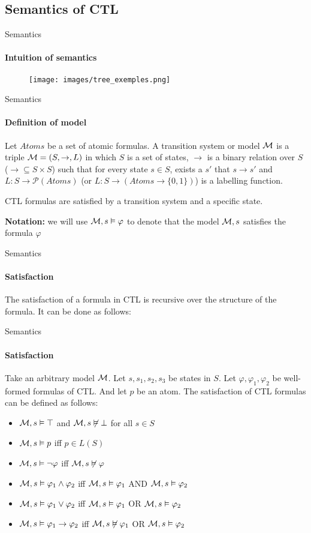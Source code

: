 \subsection{Semantics of CTL}


\begin{frame}{Semantics}
    \framesubtitle{Intuition of semantics}
    \begin{figure}
        \texttt{[image: images/tree\_exemples.png]}
    \end{figure}
\end{frame}
\begin{frame}{Semantics}
	\framesubtitle{Definition of model}
	\begin{definition}
		Let $Atoms$ be a set of atomic formulas. A \alert{transition system} or \alert{model} $\mathcal{M}$ is a triple $\mathcal{M} = (S, \to, L)$ in which $S$ is a set of states, $\to$ is a binary relation over $S$ ($\to \subseteq S\times S$) such that for every state $s\in S$, exists a $s'$ that $s \to s'$ and $L: S \to \mathcal{P}(Atoms)$ (or $L: S \to (Atoms \to \{0,1\})$) is a labelling function.
	\end{definition}\pause
    CTL formulas are satisfied by a transition system and a specific state.
    
	{\bf Notation:} we will use $\mathcal{M},s\vDash \varphi$ to denote that the model $\mathcal{M},s$ satisfies the formula $\varphi$
\end{frame}

\begin{frame}{Semantics}
    \framesubtitle{Satisfaction}
    \begin{definition}
        The \alert{satisfaction} of a formula in CTL is recursive over the structure of the formula. It can be done as follows:
    \end{definition}
\end{frame}


\begin{frame}{Semantics}
	\framesubtitle{Satisfaction}
	Take an arbitrary model $\mathcal{M}$. Let $s, s_1, s_2, s_3$ be states in $S$. Let $\varphi, \varphi_1, \varphi_2$ be well-formed formulas of CTL. And let $p$ be an atom. The satisfaction of CTL formulas can be defined as follows:
	\begin{itemize}
		\item $\mathcal{M},s \vDash \top$ and $\mathcal{M},s \not\vDash \bot$ for all $s \in S$ \pause
		\item $\mathcal{M},s \vDash p$ iff $p \in L(S)$ \pause
		\item $\mathcal{M},s \vDash \neg\varphi$ iff $\mathcal{M},s \not\vDash \varphi$ \pause
		\item $\mathcal{M},s \vDash \varphi_1 \land \varphi_2$ iff $\mathcal{M},s \vDash \varphi_1$ AND $\mathcal{M},s \vDash \varphi_2$ \pause
		\item $\mathcal{M},s \vDash \varphi_1 \lor \varphi_2$ iff $\mathcal{M},s \vDash \varphi_1$ OR $\mathcal{M},s \vDash \varphi_2$ \pause
		\item $\mathcal{M},s \vDash \varphi_1 \to \varphi_2$ iff $\mathcal{M},s \not\vDash \varphi_1$ OR $\mathcal{M},s \vDash \varphi_2$
	\end{itemize}
\end{frame}

